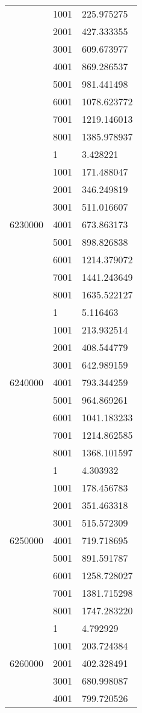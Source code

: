\begin{table}[htb!]
\begin{tabular}{lll}
 & 1001 & 225.975275 \\
 & 2001 & 427.333355 \\
 & 3001 & 609.673977 \\
 & 4001 & 869.286537 \\
 & 5001 & 981.441498 \\
 & 6001 & 1078.623772 \\
 & 7001 & 1219.146013 \\
 & 8001 & 1385.978937 \\
\multirow[c]{9}{*}{6230000} & 1 & 3.428221 \\
 & 1001 & 171.488047 \\
 & 2001 & 346.249819 \\
 & 3001 & 511.016607 \\
 & 4001 & 673.863173 \\
 & 5001 & 898.826838 \\
 & 6001 & 1214.379072 \\
 & 7001 & 1441.243649 \\
 & 8001 & 1635.522127 \\
\multirow[c]{9}{*}{6240000} & 1 & 5.116463 \\
 & 1001 & 213.932514 \\
 & 2001 & 408.544779 \\
 & 3001 & 642.989159 \\
 & 4001 & 793.344259 \\
 & 5001 & 964.869261 \\
 & 6001 & 1041.183233 \\
 & 7001 & 1214.862585 \\
 & 8001 & 1368.101597 \\
\multirow[c]{9}{*}{6250000} & 1 & 4.303932 \\
 & 1001 & 178.456783 \\
 & 2001 & 351.463318 \\
 & 3001 & 515.572309 \\
 & 4001 & 719.718695 \\
 & 5001 & 891.591787 \\
 & 6001 & 1258.728027 \\
 & 7001 & 1381.715298 \\
 & 8001 & 1747.283220 \\
\multirow[c]{9}{*}{6260000} & 1 & 4.792929 \\
 & 1001 & 203.724384 \\
 & 2001 & 402.328491 \\
 & 3001 & 680.998087 \\
 & 4001 & 799.720526 \\

\end{tabular}
\end{table}
